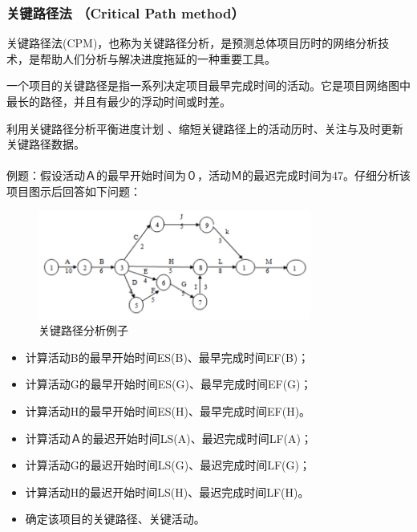 \subsubsection{关键路径法 （Critical Path method）}
关键路径法(CPM)，也称为关键路径分析，是预测总体项目历时的网络分析技术，是帮助人们分析与解决进度拖延的一种重要工具。
\par 一个项目的关键路径是指一系列决定项目最早完成时间的活动。它是项目网络图中最长的路径，并且有最少的浮动时间或时差。
\par 利用关键路径分析平衡进度计划 、缩短关键路径上的活动历时、关注与及时更新关键路径数据。\\
\newline
{}
\newline\\
例题：假设活动Ａ的最早开始时间为０，活动Ｍ的最迟完成时间为47。仔细分析该项目图示后回答如下问题：
\begin{figure}[!h]
	\centering
	\includegraphics[width=0.8\textwidth]{image/5-6}
	\caption{关键路径分析例子}
\end{figure}
\begin{itemize}
	\item 计算活动B的最早开始时间ES(B)、最早完成时间EF(B)；
	\item 计算活动G的最早开始时间ES(G)、最早完成时间EF(G)；
	\item 计算活动H的最早开始时间ES(H)、最早完成时间EF(H)。
	\item 计算活动Ａ的最迟开始时间LS(A)、最迟完成时间LF(A)；
	\item 计算活动G的最迟开始时间LS(G)、最迟完成时间LF(G)；
	\item 计算活动H的最迟开始时间LS(H)、最迟完成时间LF(H)。
	\item 确定该项目的关键路径、关键活动。
\end{itemize}
